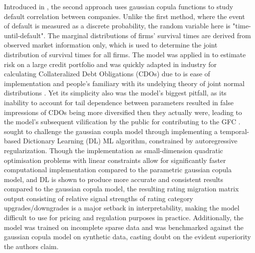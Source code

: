 \documentclass[10pt]{article}
\begin{document}
\begin{multicols*}{2}
Introduced in \citep{li}, the second approach uses gaussian copula functions to study default correlation between companies. Unlike the first method, where the event of default is measured as a discrete probability, the random variable here is "time-until-default". The marginal distributions of firms' survival times are derived from observed market information only, which is used to determine the joint distribution of survival times for all firms.
The model was applied in \citep{bourgey} to estimate risk on a large credit portfolio and was quickly adapted in industry for calculating Collateralized Debt Obligations (CDOs) due to is ease of implementation and people's familiary with its undelying theory of joint normal distributions \citep{mackenzie}. Yet its simplicity also was the model's biggest pitfall, as its inability to account for tail dependence between parameters resulted in false impressions of CDOs being more diversified then they actually were, 
leading to the model's subsequent vilification by the public for contributing to the GFC \citep{zimmer}. \citep{allouche} sought to challenge the gaussian coupla model through implementing a temporal-based Dictionary Learning (DL) ML algorithm, constrained by autoregressive regularization. Though the implementation as small-dimension quadratic optimisation problems with linear constraints allow for significantly faster computational implementation compared to the parametric gaussian copula model,
and DL is shown to produce more accurate and consistent results compared to the gaussian copula model, the resulting rating migration matrix output consisting of relative signal strengths of rating category upgrades/downgrades is a major setback in interpretability, making the model difficult to use for pricing and regulation purposes in practice. Additionally, the model was trained on incomplete sparse data and was benchmarked against the gaussian copula model on synthetic data, casting doubt on the evident superiority
the authors claim.


\end{multicols*}
\end{document}
